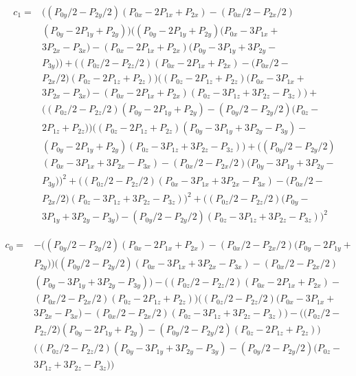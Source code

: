 \documentclass{article}
\begin{document}
\begin{equation}
\begin{aligned}
c_1 =& \big((P_{0y}/2 - P_{2y}/2)(P_{0x} - 2P_{1x} + P_{2x}) - (P_{0x}/2 - P_{2x}/2)\\
     & (P_{0y} - 2P_{1y} + P_{2y})\big)\big((P_{0y} - 2P_{1y} + P_{2y}) (P_{0x} - 3P_{1x} + \\
     & 3P_{2x} - P_{3x}) - (P_{0x} - 2P_{1x} + P_{2x})(P_{0y} - 3P_{1y} + 3P_{2y} - \\
     & P_{3y})\big) + \big((P_{0z}/2 - P_{2z}/2)(P_{0x} - 2P_{1x} + P_{2x}) - (P_{0x}/2 - \\
     & P_{2x}/2)(P_{0z} - 2P_{1z} + P_{2z})\big)\big((P_{0z} - 2P_{1z} + P_{2z})(P_{0x} - 3P_{1x} + \\
     & 3P_{2x} - P_{3x}) - (P_{0x} - 2P_{1x} + P_{2x})(P_{0z} - 3P_{1z} + 3P_{2z} - P_{3z})\big) + \\
     & \big((P_{0z}/2 - P_{2z}/2)(P_{0y} - 2P_{1y} + P_{2y}) - (P_{0y}/2 - P_{2y}/2)(P_{0z} - \\
     & 2P_{1z} + P_{2z})\big)\big((P_{0z} - 2P_{1z} + P_{2z})(P_{0y} - 3P_{1y} + 3P_{2y} - P_{3y}) - \\ 
     & (P_{0y} - 2P_{1y} + P_{2y})(P_{0z} - 3P_{1z} + 3P_{2z} - P_{3z})\big) + \big((P_{0y}/2 - P_{2y}/2) \\
     & (P_{0x} - 3P_{1x} + 3P_{2x} - P_{3x}) - (P_{0x}/2 - P_{2x}/2)(P_{0y} - 3P_{1y} + 3P_{2y} - \\
     & P_{3y})\big)^2 + \big((P_{0z}/2 - P_{2z}/2)(P_{0x} - 3P_{1x} + 3P_{2x} - P_{3x}) - (P_{0x}/2 - \\ 
     & P_{2x}/2)(P_{0z} - 3P_{1z} + 3P_{2z} - P_{3z})\big)^2 + \big((P_{0z}/2 - P_{2z}/2)(P_{0y} - \\
     & 3P_{1y} + 3P_{2y} - P_{3y}) - (P_{0y}/2 - P_{2y}/2)(P_{0z} - 3P_{1z} + 3P_{2z} - P_{3z})\big)^2
\end{aligned}
\end{equation}


\begin{equation}
\begin{aligned}
c_0 =& -\big((P_{0y}/2 - P_{2y}/2)(P_{0x} - 2P_{1x} + P_{2x}) - (P_{0x}/2 - P_{2x}/2)(P_{0y} - 2P_{1y} + \\
     & P_{2y})\big)\big((P_{0y}/2 - P_{2y}/2)(P_{0x} - 3P_{1x} + 3P_{2x} - P_{3x}) - (P_{0x}/2 - P_{2x}/2) \\
     & (P_{0y} - 3P_{1y} + 3P_{2y} - P_{3y})\big) - \big((P_{0z}/2 - P_{2z}/2)(P_{0x} - 2P_{1x} + P_{2x}) - \\
     & (P_{0x}/2 - P_{2x}/2)(P_{0z} - 2P_{1z} + P_{2z})\big)\big((P_{0z}/2 - P_{2z}/2)(P_{0x} - 3P_{1x} + \\
     & 3P_{2x} - P_{3x}) - (P_{0x}/2 - P_{2x}/2)(P_{0z} - 3P_{1z} + 3P_{2z} - P_{3z})\big) - \big((P_{0z}/2 - \\
     & P_{2z}/2)(P_{0y} - 2P_{1y} + P_{2y}) - (P_{0y}/2 - P_{2y}/2)(P_{0z} - 2P_{1z} + P_{2z})\big) \\
     & \big((P_{0z}/2 - P_{2z}/2)(P_{0y} - 3P_{1y} + 3P_{2y} - P_{3y}) - (P_{0y}/2 - P_{2y}/2)(P_{0z} - \\
     & 3P_{1z} + 3P_{2z} - P_{3z})\big)

\end{aligned}
\end{equation}
\end{document}
